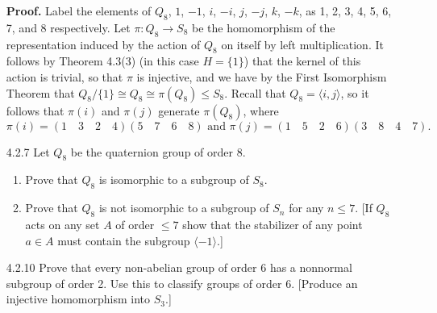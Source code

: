 \documentclass[9pt]{article}
\newcommand{\cyc}[1]{\langle #1 \rangle}
\begin{document}
\begin{enumerate}
      \textbf{Proof.} Label the elements of $Q_8$, $1$, $-1$, $i$, $-i$, $j$,
      $-j$, $k$, $-k$, as 1, 2, 3, 4, 5, 6, 7, and 8 respectively. Let
      $\pi : Q_8 \rightarrow S_8$ be the homomorphism of the representation
      induced by the action of $Q_8$ on itself by left multiplication. It
      follows by Theorem 4.3(3) (in this case $H = \{1\}$) that the kernel of
      this action is trivial, so that $\pi$ is injective, and we have by the
      First Isomorphism Theorem that
      $Q_8/\{1\} \cong Q_8 \cong \pi(Q_8) \le S_8$. Recall that
      $Q_8 = \cyc{i, j}$, so it follows that $\pi(i)$ and $\pi(j)$ generate
      $\pi(Q_8)$, where
      $$\pi(i) = (1 \quad 3 \quad 2 \quad 4)(5 \quad 7 \quad 6 \quad 8)
        \text{ and }
        \pi(j) = (1 \quad 5 \quad 2 \quad 6)(3 \quad 8 \quad 4 \quad 7).$$
   \item[4.2.7]   Let $Q_8$ be the quaternion group of order 8.
                  \begin{enumerate}
                     \item Prove that $Q_8$ is isomorphic to a subgroup of
                           $S_8$.
                     \item Prove that $Q_8$ is not isomorphic to a subgroup of
                           $S_n$ for any $n \le 7$. [If $Q_8$ acts on any set
                           $A$ of order $\le 7$ show that the stabilizer of any
                           point $a \in A$ must contain the subgroup
                           $\cyc{-1}$.]
                  \end{enumerate}
   \item[4.2.10]  Prove that every non-abelian group of order 6 has a nonnormal
                  subgroup of order 2. Use this to classify groups of order 6.
                  [Produce an injective homomorphism into $S_3$.]
\end{enumerate}
\end{document}
